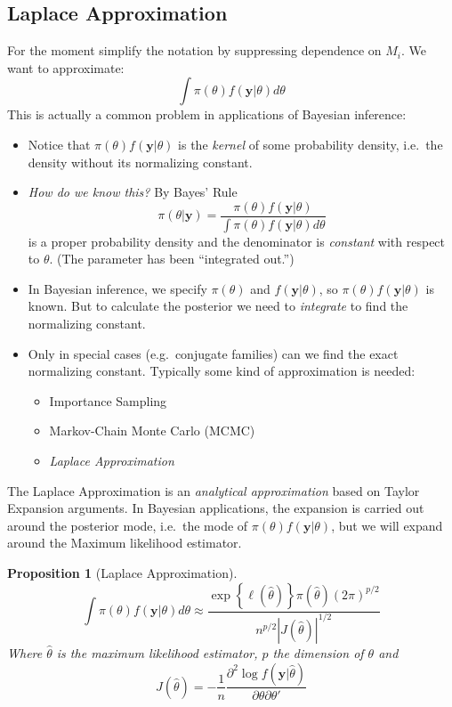 \documentclass[12pt]{article}
\newtheorem{pro}{Proposition}[section]
\theoremstyle{definition}
\begin{document}
\subsection{Laplace Approximation}
For the moment simplify the notation by suppressing dependence on $M_i$. We want to approximate: 
	$$\int \pi(\theta)f(\mathbf{y}|\theta)d\theta$$
This is actually a common problem in applications of Bayesian inference:
	\begin{itemize} 
		\item Notice that $\pi(\theta)f(\mathbf{y}|\theta)$ is the \emph{kernel} of some probability density, i.e.\ the density without its normalizing constant. 
		\item \emph{How do we know this?} By Bayes' Rule 
	$$\pi(\theta|\mathbf{y}) = \frac{\pi(\theta)f(\mathbf{y}|\theta)}{\int \pi(\theta)f(\mathbf{y}|\theta) d\theta }$$
is a proper probability density and the denominator is \emph{constant} with respect to $\theta$. (The parameter has been ``integrated out.'')
	\item In Bayesian inference, we specify $\pi(\theta)$ and $f(\mathbf{y}|\theta)$, so $\pi(\theta)f(\mathbf{y}|\theta)$ is known. But to calculate the posterior we need to \emph{integrate} to find the normalizing constant.
	\item Only in special cases (e.g.\ conjugate families) can we find the exact normalizing constant. Typically some kind of approximation is needed:  
		\begin{itemize}
			\item Importance Sampling
			\item Markov-Chain Monte Carlo (MCMC)
			\item \emph{Laplace Approximation}
		\end{itemize}
	\end{itemize}
The Laplace Approximation is an \emph{analytical approximation} based on Taylor Expansion arguments. In Bayesian applications, the expansion is carried out around the posterior mode, i.e.\ the mode of $\pi(\theta)f(\mathbf{y}|\theta)$, but we will expand around the Maximum likelihood estimator. 

\begin{pro}[Laplace Approximation]
	\label{pro:laplace}
$$\int \pi(\theta)f(\mathbf{y}|\theta)d\theta \approx \frac{\exp\left\{ \ell(\hat{\theta}) \right\} \pi(\hat{\theta})(2\pi)^{p/2}}{n^{p/2}\left| J(\hat{\theta}) \right|^{1/2}}$$
	Where $\hat{\theta}$ is the \emph{maximum likelihood estimator}, $p$ the dimension of $\theta$ and
		$$J(\hat{\theta}) = -\frac{1}{n} \frac{\partial^2 \log f(\mathbf{y}|\hat{\theta})}{\partial \theta \partial \theta'}$$
\end{pro}
\end{document}
